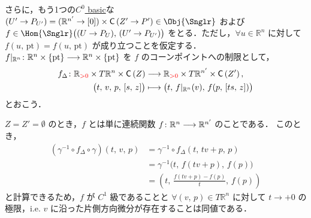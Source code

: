 \documentclass[TQFT_main]{subfiles}
\begin{document}
さらに，もう1つの\hyperref[def:C0-basic]{$C^0$ basic}な $(U' \to P_{U'}) = (\mathbb{R}^{n'} \to [0]) \times \Cone{Z' \to P'} \in \Obj{\Snglr}$ および
$f \in \Hom{\Snglr} \bigl( (U \to P_{U}),\, (U' \to P_{U'})  \bigr)$ をとる．ただし，$\forall u \in \mathbb{R}^n$ に対して $f (u,\, \mathrm{pt}) = f (u,\, \mathrm{pt})$ が成り立つことを仮定する．
$f|_{\mathbb{R}^n} \colon \mathbb{R}^n \times \{\mathrm{pt}\} \longrightarrow \mathbb{R}^n \times \{\mathrm{pt}\}$ を $f$ のコーンポイントへの制限として，
\begin{align}
    f_{\Delta} \colon \mathbb{R}_{\textcolor{red}{>0}} \times T \mathbb{R}^n \times \mathsf{C}\left( Z \right) &\longrightarrow \mathbb{R}_{\textcolor{red}{>0}} \times T \mathbb{R}^{n'} \times \mathsf{C}\left( Z' \right), \\
    \bigl( t,\, v,\, p,\, [s,\, z] \bigr) &\longmapsto \bigl( t,\, f|_{\mathbb{R}^n}(v),\, f(p,\, [ts,\, z]) \bigr)
\end{align}
とおこう．

\begin{myexample}[label=ex:cone-diff]{}
    $Z = Z' = \emptyset$ のとき，$f$ とは単に連続関数 $f \colon \mathbb{R}^n \longrightarrow \mathbb{R}^{n'}$ のことである．
    このとき，
    \begin{align}
        (\gamma^{-1} \circ f_{\Delta} \circ \gamma)(t,\, v,\, p)
        &= \gamma^{-1} \circ f_\Delta (t,\, tv+p,\, p) \\
        &= \gamma^{-1} \bigl(t,\, f(tv+p),\, f(p)\bigr) \\
        &= \left( t,\, \frac{f(tv+p) - f(p)}{t},\, f(p) \right)
    \end{align}
    と計算できるため，$f$ が $C^1$ 級であることと $\forall (v,\, p) \in T \mathbb{R}^n$ に対して $t \to +0$ の極限，i.e. $v$ に沿った片側方向微分が存在することは同値である．
\end{myexample}
\end{document}
